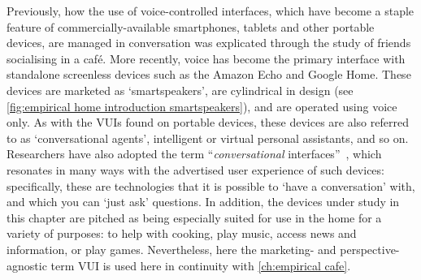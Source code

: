 Previously, how the use of voice-controlled interfaces, which have become a staple feature of commercially-available smartphones, tablets and other portable devices, are managed in conversation was explicated through the study of friends socialising in a caf\'{e}.
More recently, voice has become the primary interface with standalone screenless devices such as the Amazon Echo and Google Home.
These devices are marketed as `smartspeakers', are cylindrical in design (see \autoref{fig:empirical home introduction smartspeakers}), and are operated using voice only.
As with the \acp{VUI} found on portable devices, these devices are also referred to as `conversational agents', intelligent or virtual personal assistants, and so on.
Researchers have also adopted the term ``\textit{conversational} interfaces''~\citep[emphasis added]{McTear2016}, which resonates in many ways with the advertised user experience of such devices: specifically, these are technologies that it is possible to  `have a conversation' with, and which you can `just ask' questions.
In addition, the devices under study in this chapter are pitched as being especially suited for use in the home for a variety of purposes: to help with cooking, play music, access news and information, or play games.
Nevertheless, here the marketing- and perspective-agnostic term \acf{VUI} is used here in continuity with \autoref{ch:empirical cafe}.

